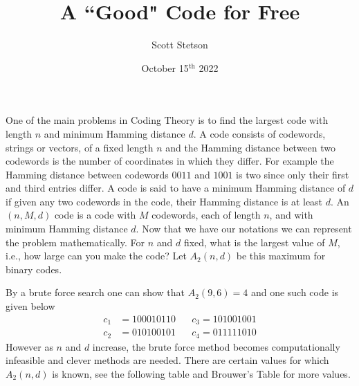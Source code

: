 \documentclass{article}
\title{A ``Good" Code for Free}
\author{Scott Stetson}
\date{October 15$^\text{th}$ 2022}
\theoremstyle{remark}
\begin{document}
	\maketitle
	One of the main problems in Coding Theory is to find the largest code with length $n$ and minimum Hamming distance $d$.  A code consists of codewords, strings or vectors, of a fixed length $n$ and the Hamming distance between two codewords is the number of coordinates in which they differ.  For example the Hamming distance between codewords $0011$ and $1001$ is two since only their first and third entries differ.  A code is said to have a minimum Hamming distance of $d$ if given any two codewords in the code, their Hamming distance is at least $d$.  An $(n,M,d)$ code is a code with $M$ codewords, each of length $n$, and with minimum Hamming distance $d$.
	Now that we have our notations we can represent the problem mathematically.  For $n$ and $d$ fixed, what is the largest value of $M$, i.e., how large can you make the code?  Let $A_2(n,d)$ be this maximum for binary codes.
	
	By a brute force search one can show that $A_2(9,6)=4$ and one such code is given below
	\begin{align*}
		c_1 & =100010110 \;\;\;\;\;\; c_3=101001001 \nonumber \\
		c_2 & =010100101 \;\;\;\;\;\; c_4=011111010
	\end{align*}
	However as $n$ and $d$ increase, the brute force method becomes computationally infeasible and clever methods are needed.  There are certain values for which $A_2(n,d)$ is known, see the following table and Brouwer's Table \cite{Brouwer} for more values.
	
\end{document}
